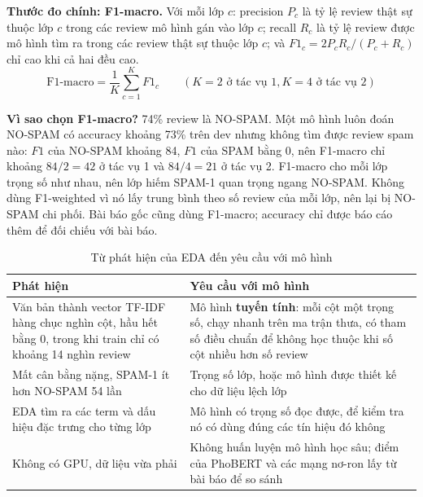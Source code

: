 \textbf{Thước đo chính: F1-macro.} Với mỗi lớp $c$: precision $P_c$ là tỷ lệ review thật sự thuộc lớp $c$ trong các review mô hình gán vào lớp $c$;
recall $R_c$ là tỷ lệ review được mô hình tìm ra trong các review thật sự thuộc lớp $c$; và $F1_c = 2 P_c R_c / (P_c + R_c)$ chỉ cao khi cả hai đều cao.
\[
\text{F1-macro} = \frac{1}{K}\sum_{c=1}^{K} F1_c \qquad (K = 2 \text{ ở tác vụ 1}, K = 4 \text{ ở tác vụ 2})
\]

\textbf{Vì sao chọn F1-macro?} 74\% review là NO-SPAM. Một mô hình luôn đoán NO-SPAM có accuracy khoảng 73\% trên dev nhưng không tìm được
review spam nào: $F1$ của NO-SPAM khoảng 84, $F1$ của SPAM bằng 0, nên F1-macro chỉ khoảng $84/2 = 42$ ở tác vụ 1 và $84/4 = 21$ ở tác vụ 2.
F1-macro cho mỗi lớp trọng số như nhau, nên lớp hiếm SPAM-1 quan trọng ngang NO-SPAM. Không dùng F1-weighted vì nó lấy trung bình theo
số review của mỗi lớp, nên lại bị NO-SPAM chi phối. Bài báo gốc cũng dùng F1-macro; accuracy chỉ được báo cáo thêm để đối chiếu với bài báo.

\begin{table}[H]
\centering
\caption{Từ phát hiện của EDA đến yêu cầu với mô hình}
\label{tab:text-eda-to-model}
\small
\begin{tabular}{>{\raggedright\arraybackslash}p{6.4cm}>{\raggedright\arraybackslash}p{8.0cm}}
\toprule
Phát hiện & Yêu cầu với mô hình\\
\midrule
Văn bản thành vector TF-IDF hàng chục nghìn cột, hầu hết bằng 0, trong khi train chỉ có khoảng 14 nghìn review & Mô hình \textbf{tuyến tính}: mỗi cột một trọng số, chạy nhanh trên ma trận thưa, có tham số điều chuẩn để không học thuộc khi số cột nhiều hơn số review\\
Mất cân bằng nặng, SPAM-1 ít hơn NO-SPAM 54 lần & Trọng số lớp, hoặc mô hình được thiết kế cho dữ liệu lệch lớp\\
EDA tìm ra các term và dấu hiệu đặc trưng cho từng lớp & Mô hình có trọng số đọc được, để kiểm tra nó có dùng đúng các tín hiệu đó không\\
Không có GPU, dữ liệu vừa phải & Không huấn luyện mô hình học sâu; điểm của PhoBERT và các mạng nơ-ron lấy từ bài báo để so sánh\\
\bottomrule
\end{tabular}
\end{table}

